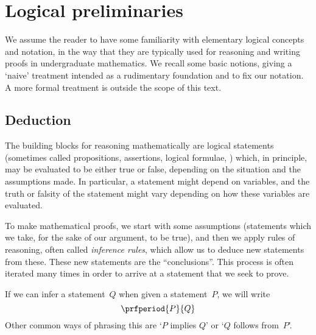 
\section{Logical preliminaries}
\label{sec:logical-prelim}


We assume the reader to have some familiarity with elementary logical concepts and notation, in the way that they are typically used for reasoning and writing proofs in undergraduate mathematics.
We recall some basic notions, giving a `naive' treatment intended as a rudimentary foundation and to fix our notation.
A more formal treatment is outside the scope of this text.


\subsection{Deduction}

The building blocks for reasoning mathematically are logical statements (sometimes called propositions, assertions, logical formulae, \etc) which, in principle, may be evaluated to be either true or false, depending on the situation and the assumptions made.
In particular, a statement might depend on variables, and the truth or falsity of the statement might vary depending on how these variables are evaluated.

To make mathematical proofs, we start with some assumptions (statements which we take, for the sake of our argument, to be true), and then we apply rules of reasoning, often called \emph{inference rules}, which allow us to deduce new statements from these.
These new statements are the ``conclusions''.
This process is often iterated many times in order to arrive at a statement that we seek to prove.

If we can infer a statement~$Q$ when given a statement~$P$, we will write
\begin{equation}
    \prfperiod
    {P}{Q}
\end{equation}
Other common ways of phrasing this are `$P$ implies $Q$' or `$Q$ follows from~$P$'.

